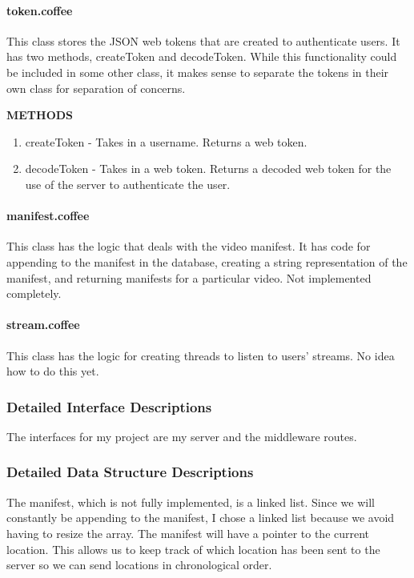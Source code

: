 \documentclass[11pt,a4paper,titlepage]{article}
\begin{document}
\paragraph{token.coffee\\}
This class stores the JSON web tokens that are created to authenticate users. It has two methods, createToken and decodeToken. While this functionality could be included in some other class, it makes sense to separate the tokens in their own class for separation of concerns.

\textbf{METHODS}
\begin{enumerate}
  \item createToken - Takes in a username. Returns a web token. 
  \item decodeToken - Takes in a web token. Returns a decoded web token for the use of the server to authenticate the user.
\end{enumerate}

\paragraph{manifest.coffee\\}
This class has the logic that deals with the video manifest. It has code for appending to the manifest in the database, creating a string representation of the manifest, and returning manifests for a particular video. Not implemented completely.

\paragraph{stream.coffee\\}
This class has the logic for creating threads to listen to users' streams. No idea how to do this yet.


\subsubsection{Detailed Interface Descriptions}
The interfaces for my project are my server and the middleware routes.
\subsubsection{Detailed Data Structure Descriptions}
The manifest, which is not fully implemented, is a linked list. Since we will constantly be appending to the manifest, I chose a linked list because we avoid having to resize the array. The manifest will have a pointer to the current location. This allows us to keep track of which location has been sent to the server so we can send locations in chronological order. 
\end{document}
